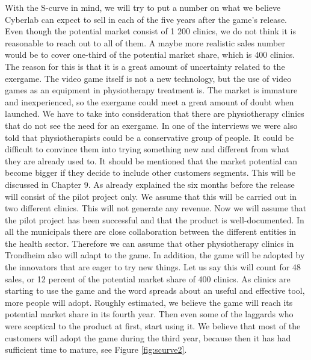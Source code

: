 With the S-curve in mind, we will try to put a number on what we believe Cyberlab can expect to sell in each of the five years after the game’s release. Even though the potential market consist of 1 200 clinics, we do not think it is reasonable to reach out to all of them. A maybe more realistic sales number would be to cover one-third of the potential market share, which is 400 clinics. The reason for this is that it is a great amount of uncertainty related to the exergame. The video game itself is not a new technology, but the use of video games as an equipment in physiotherapy treatment is. The market is immature and inexperienced, so the exergame could meet a great amount of doubt when launched. We have to take into consideration that there are physiotherapy clinics that do not see the need for an exergame. In one of the interviews we were also told that physiotherapists could be a conservative group of people. It could be difficult to convince them into trying something new and different from what they are already used to. It should be mentioned that the market potential can become bigger if they decide to include other customers segments. This will be discussed in Chapter 9. As already explained the six months before the release will consist of the pilot project only. We assume that this will be carried out in two different clinics. This will not generate any revenue. Now we will assume that the pilot project has been successful and that the product is well-documented. In all the municipals there are close collaboration between the different entities in the health sector. Therefore we can assume that other physiotherapy clinics in Trondheim also will adapt to the game. In addition, the game will be adopted by the innovators that are eager to try new things. Let us say this will count for 48 sales, or 12 percent of the potential market share of 400 clinics. As clinics are starting to use the game and the word spreads about an useful and effective tool, more people will adopt. Roughly estimated, we believe the game will reach its potential market share in its fourth year. Then even some of the laggards who were sceptical to the product at first, start using it. We believe that most of the customers will adopt the game during the third year, because then it has had sufficient time to mature, see Figure \ref{fig:scurve2}. \\ \\ 
